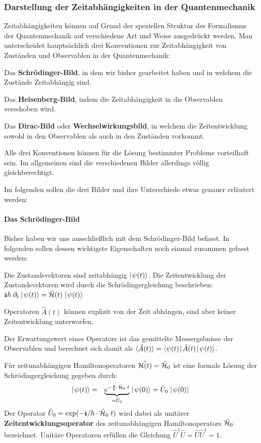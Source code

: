 \subsubsection{Darstellung der Zeitabhängigkeiten in der Quantenmechanik}
Zeitabhängigkeiten können auf Grund der speziellen Struktur des Formalismus der Quantenmechanik auf verschiedene Art und Weise ausgedrückt werden. Man unterscheidet hauptsächlich drei Konventionen zur Zeitabhängigkeit von Zuständen und Observablen in der Quantenmechanik: 
\begin{itemize1}
	\item Das {\bf Schrödinger-Bild}, in dem wir bisher gearbeitet haben und in welchem die Zustände Zeitabhängig sind.  
	\item Das {\bf Heisenberg-Bild}, indem die Zeitabhängigkeit in die Observablen verschoben wird. 
	\item Das {\bf Dirac-Bild} oder {\bf Wechselwirkungsbild}, in welchem die Zeitentwicklung sowohl in den Observablen als auch in den Zuständen vorkommt. 
\end{itemize1}
Alle drei Konventionen können für die Lösung bestimmter Probleme vorteilhaft sein. Im allgemeinen sind die verschiedenen Bilder allerdings völlig gleichberechtigt. 

Im folgenden sollen die drei Bilder und ihre Unterschiede etwas genauer erläutert werden: 

\paragraph{Das Schrödinger-Bild}

Bisher haben wir uns ausschließlich mit dem Schrödinger-Bild befasst. In folgenden sollen dessen wichtigste Eigenschaften noch einmal zusammen gefasst werden:

\begin{itemize1}
	\item Die Zustandsvektoren sind zeitabhängig $\mid\!\!\!\,\,{\psi(t)}\rangle$. Die Zeitentwicklung der Zustandsvektoren wird durch die Schrödingergleichung beschrieben: $\I\hbar\;\dell_t\ket{\psi(t)} = \hat{\ham}(t) \ket{\psi(t)}$
	\item Operatoren $\hat{A}(t)$ können explizit von der Zeit abhängen, sind aber keiner Zeitentwicklung unterworfen. 
	\item Der Erwartungswert eines Operators ist das gemittelte Messergebnisse der Observablen und berechnet sich damit als $\EW{\hat{A}(t)} = \bracket{\psi(t)}{\hat{A}(t)}{\psi(t)}$. 
	\item Für zeitunabhängigen Hamiltonoperatoren $\hat{\mathcal H(t)}=\hat{\mathcal H}_0$ ist eine formale Lösung der Schrödingergleichung gegeben durch: 
	\begin{eqnarray*}
		\ket{\psi(t)} &=& \underbrace{\e^{-\frac{\I}{\hbar}\cdot\hat{\ham}_0\;t}}_{=\hat{U}_0} \ket{\psi(0)} = \hat{U}_0\ket{\psi(0)}
	\end{eqnarray*}
	Der Operator $\hat{U}_0=\exp(-\I/\hbar\cdot\hat{\ham}_0\;t)$ wird dabei als unitärer {\bf Zeitentwicklungsoperator} des zeitunabhängigen Hamiltonoperators $\hat{\mathcal H}_0$ bezeichnet. Unitäre Operatoren erfüllen die Gleichung $\hat{U}^{\dagger}\hat{U}=\hat{U}\hat{U}^{\dagger}=1$. 
\end{itemize1}

